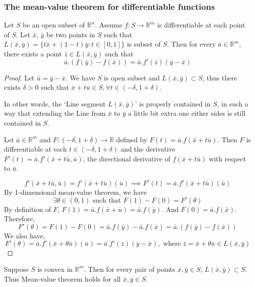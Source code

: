\subsubsection{The mean-value theorem for differentiable functions}
\begin{theorem}
Let $S$ be an open subset of $\mathbb{R}^n$.
Assume $f : S \to \mathbb{R}^m$ is differentiable at each point of $S$.
Let $\bar{x}$, $\bar{y}$ be two points in $S$ such that $L(\bar{x},\bar{y}) = \{ t\bar{x}+(1-t)\bar{y} : t \in [0,1] \}$ is subset of $S$.
Then for every $\bar{a} \in \mathbb{R}^m$, there exists a point $\bar{z} \in L(\bar{x},\bar{y})$ such that
\[ \bar{a}.\left( f(\bar{y})-f(\bar{x}) \right) = \bar{a}.f'(\bar{z})(\bar{y}-\bar{x}) \]
\end{theorem}
\begin{proof}
Let $\bar{u} = \bar{y}-\bar{x}$.
We have $S$ is open subset and $L(\bar{x},\bar{y}) \subset S$, thus there exists $\delta > 0$ such that $\bar{x}+t\bar{u} \in S, \forall t \in (-\delta,1+\delta)$.
\begin{commentary} In other words, the `Line segment $L(\bar{x},\bar{y})$' is properly contained in $S$, in such a way that extending the Line from $\bar{x}$ to $\bar{y}$ a little bit extra one either sides is still contained in $S$.\end{commentary}

Let $\bar{a} \in \mathbb{R}^m$ and $F : (-\delta,1+\delta) \to \mathbb{R}$ defined by $F(t) = \bar{a}.f(\bar{x}+t\bar{u})$.
Then $F$ is differentiable at each $t \in (-\delta,1+\delta)$ and the derivative $F'(t) = \bar{a}.f'(\bar{x}+t\bar{u},\bar{u})$, the directional derivative of $f(\bar{x}+t\bar{u})$ with respect to $\bar{u}$.

\[ f'(\bar{x}+t\bar{u},\bar{u}) = f'(\bar{x}+t\bar{u})(\bar{u}) \implies F'(t) = \bar{a}.f'(\bar{x}+t\bar{u})(\bar{u}) \]
By 1-dimensional mean-value theorem, we have
\[ \exists \theta \in (0,1) \text{ such that } F(1) - F(0) = F'(\theta) \]
By definition of $F$, $F(1) = \bar{a}.f(\bar{x}+\bar{u}) = \bar{a}.f(\bar{y})$.
And $F(0) =\bar{a}.f(\bar{x})$.
Therefore,
\[ F'(\theta) = F(1) - F(0) = \bar{a}.f(\bar{y}) - \bar{a}.f(\bar{x}) = \bar{a}.(f(\bar{y})-f(\bar{x})) \]
We also have,
\[ F'(\theta) = \bar{a}.f'(\bar{x}+\theta \bar{u})(\bar{u}) = \bar{a}.f'(\bar{z})(\bar{y}-\bar{x}), \text{ where } \bar{z} = \bar{x}+\theta \bar{u} \in L(\bar{x},\bar{y}) \]
\end{proof}

\begin{remark}
Suppose $S$ is convex in $\mathbb{R}^m$.
Then for every pair of points $\bar{x},\bar{y} \in S$, $L(\bar{x},\bar{y}) \subset S$.
Thus Mean-value theorem holds for all $\bar{x},\bar{y} \in S$.
\end{remark}

